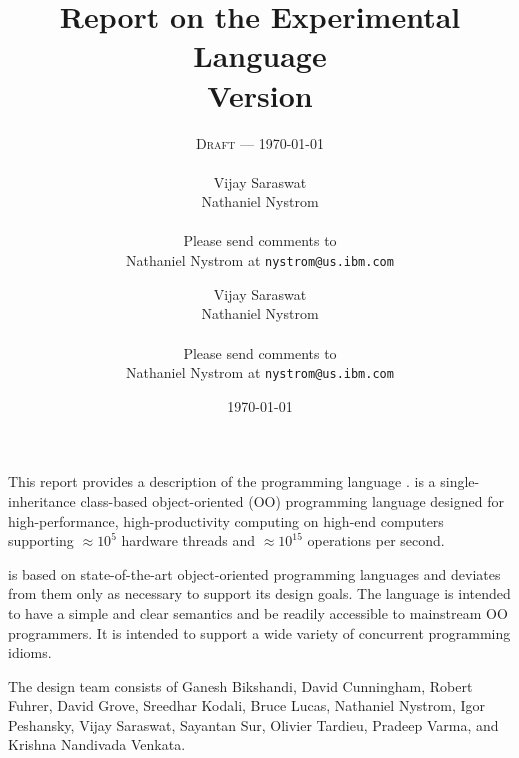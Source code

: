 
\thispagestyle{empty}


\title{Report on the Experimental Language \Xten \\
\large Version \integerversion}
\ifdraft
\author{\textsc{Draft} --- \today \\
\\
Vijay Saraswat \\
Nathaniel Nystrom \\
\\
Please send comments to \\
Nathaniel Nystrom at \texttt{nystrom@us.ibm.com}}
\else
\author{
Vijay Saraswat \\
Nathaniel Nystrom \\
\\
Please send comments to \\
Nathaniel Nystrom at \texttt{nystrom@us.ibm.com}}
\fi
\date{\today}

\maketitle

\newcommand\authorsc[1]{#1}

This report provides a description of the programming
language \Xten. \Xten{} is a single-inheritance class-based object-oriented
(OO) programming language designed for high-performance, high-productivity
computing on high-end computers supporting $\approx 10^5$ hardware threads
and $\approx 10^{15}$ operations per second. 

{}\Xten{} is based on state-of-the-art object-oriented programming
languages and deviates from them only as necessary to support its
design goals. The language is intended to have a simple and clear
semantics and be readily accessible to mainstream OO programmers. It
is intended to support a wide variety of concurrent programming
idioms.


The \Xten{} design team consists of
\authorsc{Ganesh Bikshandi}, 
\authorsc{David Cunningham},
\authorsc{Robert Fuhrer},
\authorsc{David Grove},
\authorsc{Sreedhar Kodali}, 
\authorsc{Bruce Lucas},
\authorsc{Nathaniel Nystrom},
\authorsc{Igor Peshansky}, 
\authorsc{Vijay Saraswat},
\authorsc{Sayantan Sur}, 
\authorsc{Olivier Tardieu},
\authorsc{Pradeep Varma}, and
\authorsc{Krishna Nandivada Venkata}.


